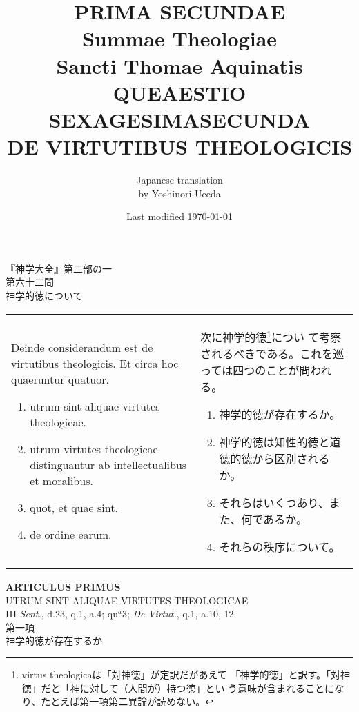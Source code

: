 \documentclass[10pt]{jsarticle}
\title{{\bf PRIMA SECUNDAE}\\{\HUGE Summae Theologiae}\\Sancti Thomae
Aquinatis\\{\sffamily QUEAESTIO SEXAGESIMASECUNDA}\\DE VIRTUTIBUS THEOLOGICIS}
\author{Japanese translation\\by Yoshinori {\sc Ueeda}}
\date{Last modified \today}
\begin{document}
\maketitle
\thispagestyle{empty}

\begin{center}
{\LARGE 『神学大全』第二部の一}\\
{\Large 第六十二問\\神学的徳について}
\end{center}

\begin{longtable}{p{21em}p{21em}}

Deinde considerandum est de virtutibus theologicis. Et circa hoc quaeruntur quatuor. 

\begin{enumerate}
 \item utrum sint aliquae virtutes theologicae.
 \item utrum virtutes theologicae distinguantur ab intellectualibus et moralibus.
 \item quot, et quae sint.
 \item de ordine earum.
\end{enumerate}

&

 次に神学的徳\footnote{virtus theologicaは「対神徳」が定訳だがあえて
 「神学的徳」と訳す。「対神徳」だと「神に対して（人間が）持つ徳」とい
 う意味が含まれることになり、たとえば第一項第二異論が読めない。}につい
 て考察されるべきである。これを巡っては四つのことが問われる。

\begin{enumerate}
 \item 神学的徳が存在するか。
 \item 神学的徳は知性的徳と道徳的徳から区別されるか。
 \item それらはいくつあり、また、何であるか。
 \item それらの秩序について。
\end{enumerate}
\end{longtable}

\newpage

\begin{center}
{\Large {\bf ARTICULUS PRIMUS}}\\
{\large UTRUM SINT ALIQUAE VIRTUTES THEOLOGICAE}\\
{\footnotesize III {\itshape Sent.}, d.23, q.1, a.4; qu$^{a}$3; {\itshape De Virtut.}, q.1, a.10, 12.}\\
{\Large 第一項\\神学的徳が存在するか}
\end{center}
\end{document}
